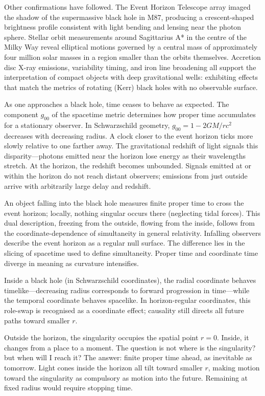 Other confirmations have followed. The Event Horizon Telescope array imaged the shadow of the supermassive black hole in M87, producing a crescent-shaped brightness profile consistent with light bending and lensing near the photon sphere. Stellar orbit measurements around Sagittarius A* in the centre of the Milky Way reveal elliptical motions governed by a central mass of approximately four million solar masses in a region smaller than the orbits themselves. Accretion disc X-ray emissions, variability timing, and iron line broadening all support the interpretation of compact objects with deep gravitational wells: exhibiting effects that match the metrics of rotating (Kerr) black holes with no observable surface.

As one approaches a black hole, time ceases to behave as expected. The component $g_{00}$ of the spacetime metric determines how proper time accumulates for a stationary observer. In Schwarzschild geometry, $g_{00} = 1 - 2GM/rc^2$ decreases with decreasing radius. A clock closer to the event horizon ticks more slowly relative to one farther away. The gravitational redshift of light signals this disparity—photons emitted near the horizon lose energy as their wavelengths stretch. At the horizon, the redshift becomes unbounded. Signals emitted at or within the horizon do not reach distant observers; emissions from just outside arrive with arbitrarily large delay and redshift.

An object falling into the black hole measures finite proper time to cross the event horizon; locally, nothing singular occurs there (neglecting tidal forces). This dual description, freezing from the outside, flowing from the inside, follows from the coordinate-dependence of simultaneity in general relativity. Infalling observers describe the event horizon as a regular null surface. The difference lies in the slicing of spacetime used to define simultaneity. Proper time and coordinate time diverge in meaning as curvature intensifies.

Inside a black hole (in Schwarzschild coordinates), the radial coordinate behaves timelike—decreasing radius corresponds to forward progression in time—while the temporal coordinate behaves spacelike. In horizon-regular coordinates, this role-swap is recognised as a coordinate effect; causality still directs all future paths toward smaller $r$.

Outside the horizon, the singularity occupies the spatial point $r = 0$. Inside, it changes from a place to a moment. The question is not \QSOpen{}where is the singularity?\QSClose{} but \QSOpen{}when will I reach it?\QSClose{} The answer: finite proper time ahead, as inevitable as tomorrow. Light cones inside the horizon all tilt toward smaller $r$, making motion toward the singularity as compulsory as motion into the future. Remaining at fixed radius would require stopping time.

